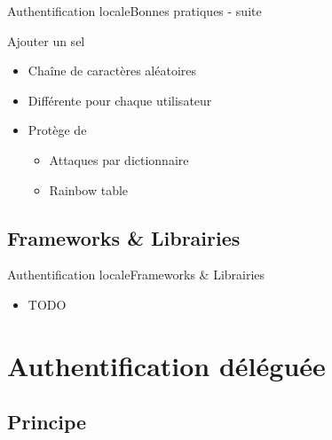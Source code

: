 \documentclass{beamer}
\begin{document}
\begin{frame}{Authentification locale}{Bonnes pratiques - suite}
  \begin{center}
    \begin{block}{Ajouter un sel}
      \begin{itemize}
        \item Chaîne de caractères aléatoires
        \item Différente pour chaque utilisateur
        \item Protège de
          \begin{itemize}
            \item Attaques par dictionnaire
            \item Rainbow table
          \end{itemize}
      \end{itemize}
    \end{block}
  \end{center}
\end{frame}

\subsection{Frameworks \& Librairies}

\begin{frame}{Authentification locale}{Frameworks \& Librairies}
  \begin{center}
    \begin{itemize}
    \item TODO
    \end{itemize}
  \end{center}
\end{frame}

\section{Authentification déléguée}

\subsection{Principe}
\end{document}
